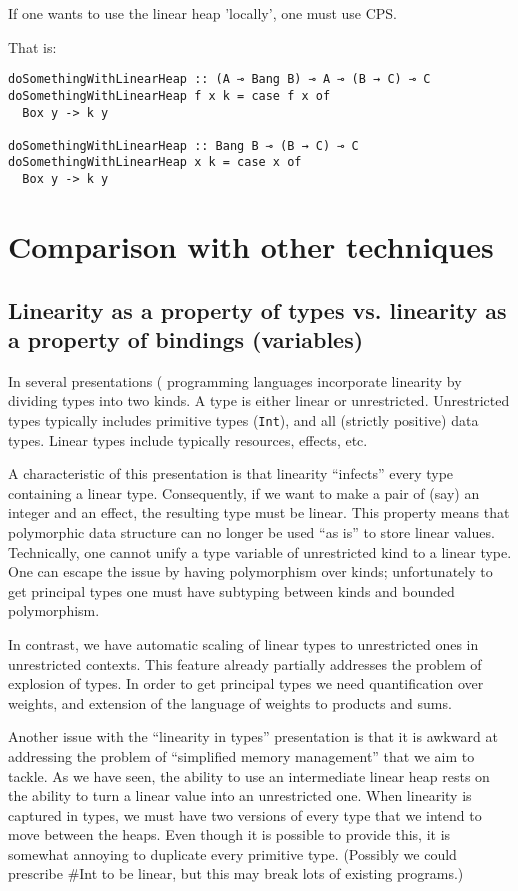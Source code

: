 \documentclass[11pt]{article}
\begin{document}
If one wants to use the linear heap 'locally', one must use CPS.

That is:

\begin{verbatim}
doSomethingWithLinearHeap :: (A ⊸ Bang B) ⊸ A ⊸ (B → C) ⊸ C
doSomethingWithLinearHeap f x k = case f x of
  Box y -> k y

doSomethingWithLinearHeap :: Bang B ⊸ (B → C) ⊸ C
doSomethingWithLinearHeap x k = case x of
  Box y -> k y
\end{verbatim}

\section{Comparison with other techniques}

\subsection{Linearity as a property of types vs. linearity as a property of bindings (variables)}

In several presentations (\cite{wadler_linear_1990,mazurak_lightweight_2010,morris_best_2016}
programming languages incorporate
linearity by dividing types into two kinds. A type is either linear
or unrestricted. Unrestricted types typically includes primitive types
(\texttt{Int}), and all (strictly positive) data types. Linear types
include typically resources, effects, etc.

A characteristic of this presentation is that linearity ``infects''
every type containing a linear type. Consequently, if we want to make
a pair of (say) an integer and an effect, the resulting type must be
linear. This property means that polymorphic data structure can no
longer be used ``as is'' to store linear values. Technically, one
cannot unify a type variable of unrestricted kind to a linear
type. One can escape the issue by having polymorphism over kinds;
unfortunately to get principal types one must have subtyping between
kinds and bounded polymorphism.

In contrast, we have automatic scaling of linear types to unrestricted
ones in unrestricted contexts. This feature already partially
addresses the problem of explosion of types. In order to get principal
types we need quantification over weights, and extension of the
language of weights to products and sums.

Another issue with the ``linearity in types'' presentation is that it
is awkward at addressing the problem of ``simplified memory
management'' that we aim to tackle. As we have seen, the ability to
use an intermediate linear heap rests on the ability to turn a linear
value into an unrestricted one. When linearity is captured in types,
we must have two versions of every type that we intend to move between
the heaps. Even though it is possible to provide this, it is somewhat
annoying to duplicate every primitive type. (Possibly we could
prescribe \#Int to be linear, but this may break lots of existing
programs.)
\end{document}
